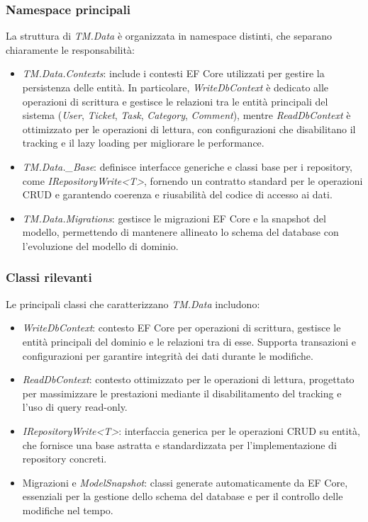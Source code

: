 \subsubsection{Namespace principali}

La struttura di \textit{TM.Data} è organizzata in namespace distinti, che separano chiaramente le responsabilità:
\begin{itemize}
\item \textit{TM.Data.Contexts}: include i contesti EF Core utilizzati per gestire la persistenza delle entità. In particolare, \textit{WriteDbContext} è dedicato alle operazioni di scrittura e gestisce le relazioni tra le entità principali del sistema (\textit{User}, \textit{Ticket}, \textit{Task}, \textit{Category}, \textit{Comment}), mentre \textit{ReadDbContext} è ottimizzato per le operazioni di lettura, con configurazioni che disabilitano il tracking e il lazy loading per migliorare le performance.
\item \textit{TM.Data.\_Base}: definisce interfacce generiche e classi base per i repository, come \textit{IRepositoryWrite<T>}, fornendo un contratto standard per le operazioni CRUD e garantendo coerenza e riusabilità del codice di accesso ai dati.
\item \textit{TM.Data.Migrations}: gestisce le migrazioni EF Core e la snapshot del modello, permettendo di mantenere allineato lo schema del database con l'evoluzione del modello di dominio.
\end{itemize}

\subsubsection{Classi rilevanti}

Le principali classi che caratterizzano \textit{TM.Data} includono:
\begin{itemize}
\item \textit{WriteDbContext}: contesto EF Core per operazioni di scrittura, gestisce le entità principali del dominio e le relazioni tra di esse. Supporta transazioni e configurazioni per garantire integrità dei dati durante le modifiche.
\item \textit{ReadDbContext}: contesto ottimizzato per le operazioni di lettura, progettato per massimizzare le prestazioni mediante il disabilitamento del tracking e l'uso di query read-only.
\item \textit{IRepositoryWrite<T>}: interfaccia generica per le operazioni CRUD su entità, che fornisce una base astratta e standardizzata per l'implementazione di repository concreti.
\item Migrazioni e \textit{ModelSnapshot}: classi generate automaticamente da EF Core, essenziali per la gestione dello schema del database e per il controllo delle modifiche nel tempo.
\end{itemize}

